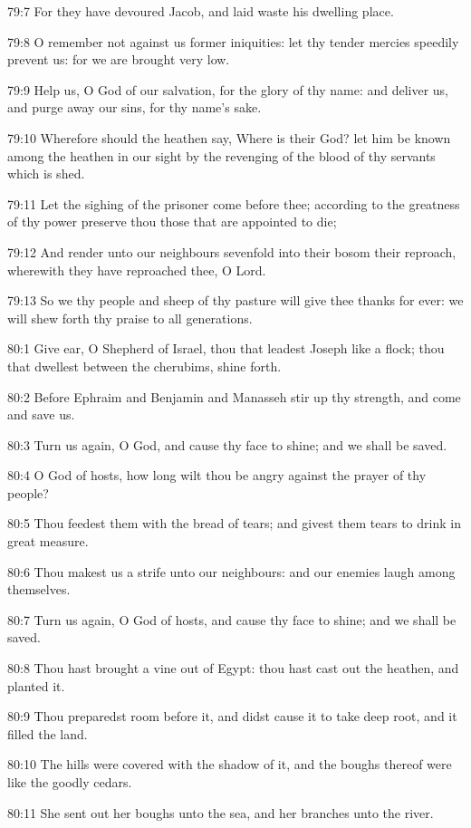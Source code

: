 79:7 For they have devoured Jacob, and laid waste his dwelling place.

79:8 O remember not against us former iniquities: let thy tender mercies speedily prevent us: for we are brought very low.

79:9 Help us, O God of our salvation, for the glory of thy name: and deliver us, and purge away our sins, for thy name's sake.

79:10 Wherefore should the heathen say, Where is their God? let him be known among the heathen in our sight by the revenging of the blood of thy servants which is shed.

79:11 Let the sighing of the prisoner come before thee; according to the greatness of thy power preserve thou those that are appointed to die;

79:12 And render unto our neighbours sevenfold into their bosom their reproach, wherewith they have reproached thee, O Lord.

79:13 So we thy people and sheep of thy pasture will give thee thanks for ever: we will shew forth thy praise to all generations.



80:1 Give ear, O Shepherd of Israel, thou that leadest Joseph like a flock; thou that dwellest between the cherubims, shine forth.

80:2 Before Ephraim and Benjamin and Manasseh stir up thy strength, and come and save us.

80:3 Turn us again, O God, and cause thy face to shine; and we shall be saved.

80:4 O \LORD God of hosts, how long wilt thou be angry against the prayer of thy people?

80:5 Thou feedest them with the bread of tears; and givest them tears to drink in great measure.

80:6 Thou makest us a strife unto our neighbours: and our enemies laugh among themselves.

80:7 Turn us again, O God of hosts, and cause thy face to shine; and we shall be saved.

80:8 Thou hast brought a vine out of Egypt: thou hast cast out the heathen, and planted it.

80:9 Thou preparedst room before it, and didst cause it to take deep root, and it filled the land.

80:10 The hills were covered with the shadow of it, and the boughs thereof were like the goodly cedars.

80:11 She sent out her boughs unto the sea, and her branches unto the river.

